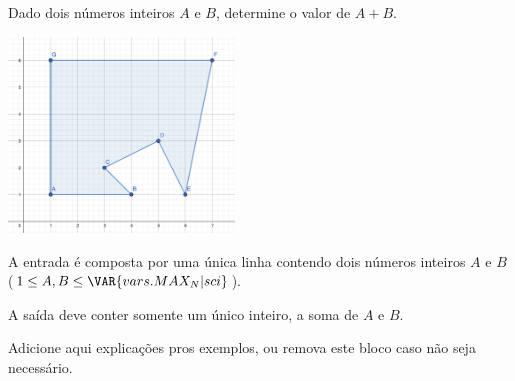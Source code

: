 Dado dois números inteiros $A$ e $B$, determine o valor de $A + B$.

\includegraphics[width=6cm]{projecao.png}

A entrada é composta por uma única linha contendo dois números
inteiros $A$ e $B$ ($1 \leq A, B \leq \VAR{vars.MAX_N | sci}$).

A saída deve conter somente um único inteiro, a soma de $A$ e $B$.

Adicione aqui explicações pros exemplos, ou remova este bloco caso não seja necessário.

